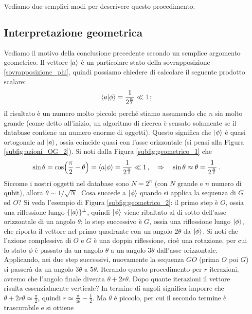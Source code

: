 \noindent Vediamo due semplici modi per descrivere questo procedimento. 

\subsection{Interpretazione geometrica}
Vediamo il motivo della conclusione precedente secondo un semplice argomento geometrico. Il vettore $\ket{a}$ è un particolare stato della sovrapposizione \eqref{sovrapposizione_phi}, quindi possiamo chiedere di calcolare il seguente prodotto scalare:
\begin{equation*}
    \ip{a}{\phi}=\frac{1}{2^{\frac n2}} \ll 1 \, ;
\end{equation*}
il risultato è un numero molto piccolo perché stiamo assumendo che $n$ sia molto grande (come detto all'inizio, un algoritmo di ricerca è sensato solamente se il database contiene un numero enorme di oggetti). Questo significa che $\ket{\phi}$ è quasi ortogonale ad $\ket{a}$, ossia coincide quasi con l'asse orizzontale (si pensi alla Figura \ref{subfig:azioni_OG_2}). Si noti dalla Figura \ref{subfig:geometrico_1} che 
\begin{equation*}
    \sin \theta = \cos \! \left( \frac{\pi}{2} - \theta \right) = \ip{a}{\phi} = \frac{1}{2^{\frac{n}{2}}} \ll 1 \, , \quad \Rightarrow \quad \sin \theta \approx \theta = \frac{1}{2^{\frac{n}{2}}} \, .
\end{equation*}
Siccome i nostri oggetti nel database sono $N=2^n$ (con $N$ grande e $n$ numero di qubit), allora $\theta\sim 1/\sqrt{N}$. Cosa succede a $\ket{\phi}$ quando si applica la sequenza di $G$ ed $O$? Si veda l'esempio di Figura \ref{subfig:geometrico_2}: il primo step è $O$, ossia una riflessione lungo $\{ \ket{a} \}^\perp$, quindi $\ket{\phi}$ viene ribaltato al di sotto dell'asse orizzontale di un angolo $\theta$; lo step successivo è $G$, ossia una riflessione lungo $\ket{\phi}$, che riporta il vettore nel primo quadrante con un angolo $2 \theta$ da $\ket{\phi}$. Si noti che l'azione complessiva di $O$ e $G$ è una doppia riflessione, cioè una rotazione, per cui lo stato $\phi$ è passato da un angolo $\theta$ a un angolo $3\theta$ dall'asse orizzontale. Applicando, nei due step successivi, nuovamente la sequenza $GO$ (prima $O$ poi $G$) si passerà da un angolo $3\theta$ a $5\theta$. Iterando questo procedimento per $r$ iterazioni, avremo che l'angolo finale diventa $\theta +2r\theta$. Dopo quante iterazioni il vettore risulta essenzialmente verticale? In termine di angoli significa imporre che $\theta +2r\theta \simeq \frac{\pi}{2}$, quindi  $r \simeq \frac{\pi}{4\theta}-\frac 12$. Ma $\theta$ è piccolo, per cui il secondo termine è trascurabile e si ottiene 
